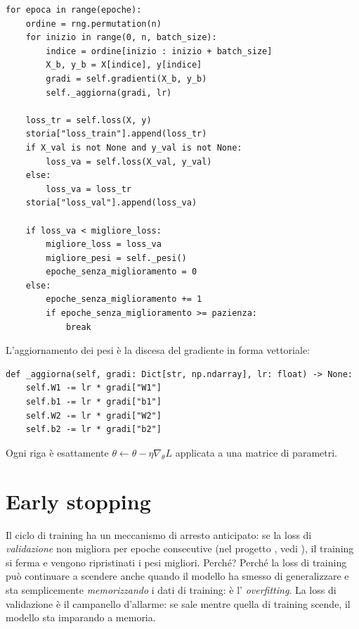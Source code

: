 \begin{lstlisting}[caption={Ciclo di training in \file{mlp.py} (metodo \codice{train}, abbreviato).}]
for epoca in range(epoche):
    ordine = rng.permutation(n)
    for inizio in range(0, n, batch_size):
        indice = ordine[inizio : inizio + batch_size]
        X_b, y_b = X[indice], y[indice]
        gradi = self.gradienti(X_b, y_b)
        self._aggiorna(gradi, lr)

    loss_tr = self.loss(X, y)
    storia["loss_train"].append(loss_tr)
    if X_val is not None and y_val is not None:
        loss_va = self.loss(X_val, y_val)
    else:
        loss_va = loss_tr
    storia["loss_val"].append(loss_va)

    if loss_va < migliore_loss:
        migliore_loss = loss_va
        migliore_pesi = self._pesi()
        epoche_senza_miglioramento = 0
    else:
        epoche_senza_miglioramento += 1
        if epoche_senza_miglioramento >= pazienza:
            break
\end{lstlisting}

L'aggiornamento dei pesi è la discesa del gradiente in forma vettoriale:

\begin{lstlisting}[caption={Aggiornamento dei pesi (metodo \codice{\_aggiorna}).}]
def _aggiorna(self, gradi: Dict[str, np.ndarray], lr: float) -> None:
    self.W1 -= lr * gradi["W1"]
    self.b1 -= lr * gradi["b1"]
    self.W2 -= lr * gradi["W2"]
    self.b2 -= lr * gradi["b2"]
\end{lstlisting}

Ogni riga è esattamente $\theta \leftarrow \theta - \eta \nabla_\theta L$
applicata a una matrice di parametri.

\section{Early stopping}\label{sec:early-stopping}

Il ciclo di training ha un meccanismo di arresto anticipato: se la loss di
\emph{validazione} non migliora per  epoche consecutive
(nel progetto , vedi
), il training si ferma e
vengono ripristinati i pesi migliori. Perché? Perché la loss di training
può continuare a scendere anche quando il modello ha smesso di generalizzare
e sta semplicemente \emph{memorizzando} i dati di training: è l'
\emph{overfitting}. La loss di validazione è il campanello d'allarme: se
sale mentre quella di training scende, il modello sta imparando a memoria.

